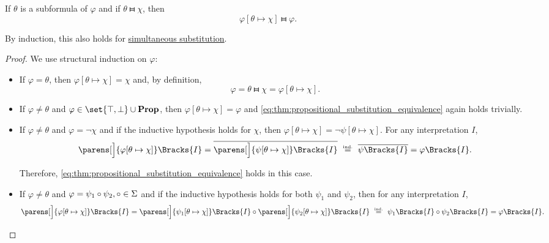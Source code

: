 \begin{proposition}\label{thm:propositional_substitution_equivalence}
  If \( \theta \) is a subformula of \( \varphi \) and if \( \theta \gleichstark \chi \), then
  \begin{equation}\label{eq:thm:propositional_substitution_equivalence}
    \varphi[\theta \mapsto \chi] \gleichstark \varphi.
  \end{equation}

  By induction, this also holds for \hyperref[def:propositional_substitution/simultaneous]{simultaneous substitution}.
\end{proposition}
\begin{proof}
  We use structural induction on \( \varphi \):

  \begin{itemize}
    \item If \( \varphi = \theta \), then \( \varphi[\theta \mapsto \chi] = \chi \) and, by definition,
    \begin{equation*}
      \varphi = \theta \gleichstark \chi = \varphi[\theta \mapsto \chi].
    \end{equation*}

    \item If \( \varphi \neq \theta \) and \( \varphi \in \set{ \top, \bot } \cup \boldop{Prop} \), then \( \varphi[\theta \mapsto \chi] = \varphi \) and \eqref{eq:thm:propositional_substitution_equivalence} again holds trivially.

    \item If \( \varphi \neq \theta \) and \( \varphi = \neg \chi \) and if the inductive hypothesis holds for \( \chi \), then \( \varphi[\theta \mapsto \chi] = \neg \psi[\theta \mapsto \chi] \). For any interpretation \( I \),
    \begin{equation*}
      \parens[\Big]{ \varphi[\theta \mapsto \chi] }\Bracks{I}
      =
      \overline{\parens[\Big]{ \psi[\theta \mapsto \chi] }\Bracks{I}}
      \reloset {\T{ind.}} =
      \overline{\psi\Bracks{I}}
      =
      \varphi\Bracks{I}.
    \end{equation*}

    Therefore, \eqref{eq:thm:propositional_substitution_equivalence} holds in this case.

    \item If \( \varphi \neq \theta \) and \( \varphi = \psi_1 \bincirc \psi_2, \bincirc \in \Sigma \) and if the inductive hypothesis holds for both \( \psi_1 \) and \( \psi_2 \), then for any interpretation \( I \),
    \begin{equation*}
      \parens[\Big]{ \varphi[\theta \mapsto \chi] }\Bracks{I}
      =
      \parens[\Big]{ \psi_1[\theta \mapsto \chi] }\Bracks{I} \bincirc \parens[\Big]{ \psi_2[\theta \mapsto \chi] }\Bracks{I}
      \reloset {\T{ind.}} =
      \psi_1\Bracks{I} \bincirc \psi_2\Bracks{I}
      =
      \varphi\Bracks{I}.
    \end{equation*}


\end{itemize}
\end{proof}
